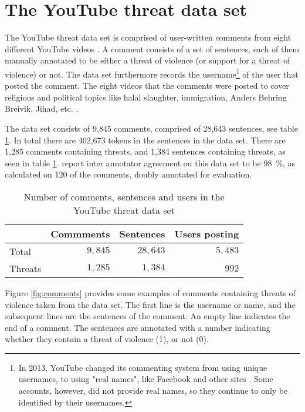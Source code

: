 \documentclass[11pt,letterpaper]{article}
\newcommand{\tov}{threat of violence}
\newcommand{\tovs}{threats of violence}
\newcommand{\ds}{the YouTube threat data set}
\begin{document}
\section{The YouTube threat data set}
\label{sec:data}
The YouTube threat data set is comprised of user-written comments from
eight different YouTube videos \cite{hammer2014}. A comment
consists of a set of sentences, each of them manually annotated to be
either a \tov{} (or support for a \tov{}) or not. The data set
furthermore records the username\footnote{In 2013, YouTube changed its
  commenting system from using unique usernames, to using "real
  names", like Facebook and other sites \cite{youtube2013}. Some
  accounts, however, did not provide real names, so they continue to
  only be identified by their usernames.} of the user that posted the
comment. The eight videos that the comments were posted to cover religious and political topics like halal slaughter, immigration,
Anders Behring Breivik, Jihad, etc. \cite{hammer2014}. 

The data set consists of 9,845 comments, comprised of 28,643
sentences, see table \ref{tab:dataset}. In total there are 402,673
tokens in the sentences in the data set. There are 1,285 comments
containing threats, and 1,384 sentences containing threats, as seen in
table \ref{tab:dataset}.   report inter annotator
agreement on this data set to be 98~\%, as calculated on 120 of the
comments, doubly annotated for evaluation.

\begin{table}
\begin{center}
\begin{tabular}{lrrr}
  \toprule
  
  & Commments  & Sentences  & Users posting \\
  \midrule
	
  
  Total  & $9,845$  & $28,643$  & $5,483$  \\
  Threats  & $1,285$  & $1,384$  & $992$  \\
  \bottomrule

\end{tabular}
\end{center}
\caption{Number of comments, sentences and users in \ds{}}
\label{tab:dataset}
\end{table}

Figure \ref{fig:comments} provides some examples of comments containing
\tovs{} taken from the data set. The first line is the username or
name, and the subsequent lines are the sentences of the comment. An
empty line indicates the end of a comment. The sentences are annotated
with a number indicating whether they contain a \tov{} (1), or not
(0).
\end{document}
